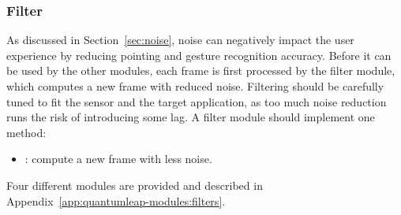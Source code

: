 \subsubsection{Filter}
As discussed in Section~\ref{sec:noise}, noise can negatively impact the user experience by reducing pointing and gesture recognition accuracy. Before it can be used by the other modules, each frame is first processed by the filter module, which computes a new frame with reduced noise. Filtering should be carefully tuned to fit the sensor and the target application, as too much noise reduction runs the risk of introducing some lag. A filter module should implement one method:
\begin{itemize}[noitemsep]
    \item {}: compute a new frame with less noise.
\end{itemize}
Four different modules are provided and described in Appendix~\ref{app:quantumleap-modules:filters}.

